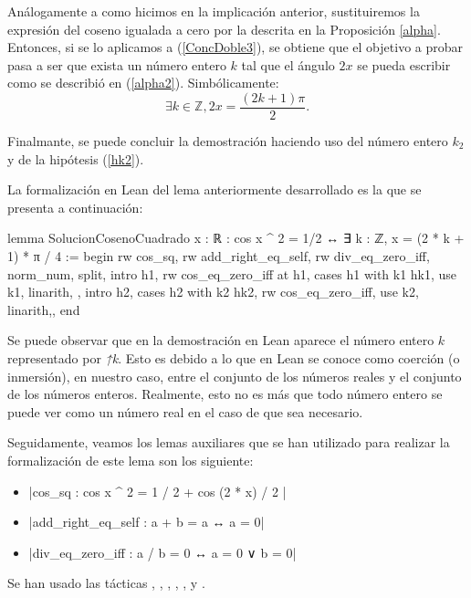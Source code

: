 \begin{demostracion}
    Análogamente a como hicimos en la implicación anterior,
    sustituiremos la expresión del coseno igualada a cero por la
    descrita en la Proposición \ref{alpha}. Entonces, si se lo aplicamos
    a (\ref{ConcDoble3}), se obtiene que el objetivo a probar pasa a ser
    que exista un número entero \(k\) tal que el ángulo \(2x\) se pueda
    escribir como se describió en (\ref{alpha2}). Simbólicamente:
    \begin{equation}
      ∃ k∈ ℤ, 2x = \frac{(2k+1)π}{2}.
    \end{equation}

    Finalmante, se puede concluir la demostración haciendo uso del
    número entero \(k_2\) y de la hipótesis (\ref{hk2}).
\end{demostracion}

La formalización en Lean del lema anteriormente desarrollado es
la que se presenta a continuación:
\begin{leancode}
lemma SolucionCosenoCuadrado
  {x : ℝ}
  : cos x ^ 2 = 1/2 ↔ ∃ k : ℤ, x = (2 * k + 1) * π / 4 :=
begin
  rw cos_sq,
  rw add_right_eq_self,
  rw div_eq_zero_iff,
  norm_num,
  split,
  { intro h1,
    rw cos_eq_zero_iff at h1,
    cases h1 with k1 hk1,
    use k1,
    linarith, },
  { intro h2,
    cases h2 with k2 hk2,
    rw cos_eq_zero_iff,
    use k2,
    linarith,},
end
\end{leancode}

Se puede observar que en la demostración en Lean aparece el número
entero \(k\) representado por \textit{↑k}. Esto es debido a lo que en
Lean se conoce como coerción (o inmersión), en nuestro caso, entre el
conjunto de los números reales y el conjunto de los números
enteros. Realmente, esto no es más que todo número entero se puede ver
como un número real en el caso de que sea necesario.

Seguidamente, veamos los lemas auxiliares que se han utilizado
para realizar la formalización de este lema son los siguiente:
\begin{itemize}
\item {}|cos_sq : cos x ^ 2 = 1 / 2 + cos (2 * x) / 2 |
\item {}|add_right_eq_self : a + b = a ↔ a = 0|
\item {}|div_eq_zero_iff : a / b = 0 ↔ a = 0 ∨ b = 0|
\end{itemize}
Se han usado las tácticas
,
,
,
,
,
 y
.

